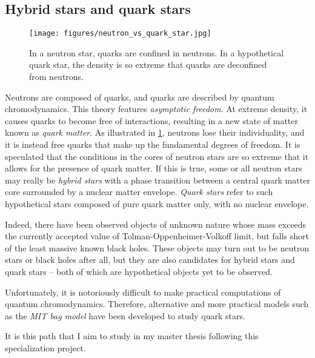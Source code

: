 \subsection*{Hybrid stars and quark stars}

\begin{figure}
\centering
\texttt{[image: figures/neutron\_vs\_quark\_star.jpg]}
\caption{\label{fig:conclusion:neutron_vs_quark_star}%
	In a neutron star, quarks are confined in neutrons.
	In a hypothetical quark star, the density is so extreme that quarks are deconfined from neutrons.
}
\end{figure}

Neutrons are composed of quarks, and quarks are described by quantum chromodynamics.
This theory features \emph{asymptotic freedom}.
At extreme density, it causes quarks to become free of interactions, resulting in a new state of matter known as \emph{quark matter}.
As illustrated in \cref{fig:conclusion:neutron_vs_quark_star}, neutrons lose their individuality, and it is instead free quarks that make up the fundamental degrees of freedom.
It is speculated that the conditions in the cores of neutron stars are so extreme that it allows for the presence of quark matter.
If this is true, some or all neutron stars may really be \emph{hybrid stars} with a phase transition between a central quark matter core surrounded by a nuclear matter envelope.
\emph{Quark stars} refer to such hypothetical stars composed of pure quark matter only, with no nuclear envelope.
\cite[chapter 8]{ref:glendenning}

Indeed, there have been observed objects of unknown nature whose mass exceeds the currently accepted value of Tolman-Oppenheimer-Volkoff limit, but falls short of the least massive known black holes. \cite{ref:wiki_list_star_massess}
These objects may turn out to be neutron stars or black holes after all, but they are also candidates for hybrid stars and quark stars -- both of which are hypothetical objects yet to be observed.

Unfortunately, it is notoriously difficult to make practical computations of quantum chromodynamics.
Therefore, alternative and more practical models such as the \emph{MIT bag model} have been developed to study quark stars.

It is this path that I aim to study in my master thesis following this specialization project.

